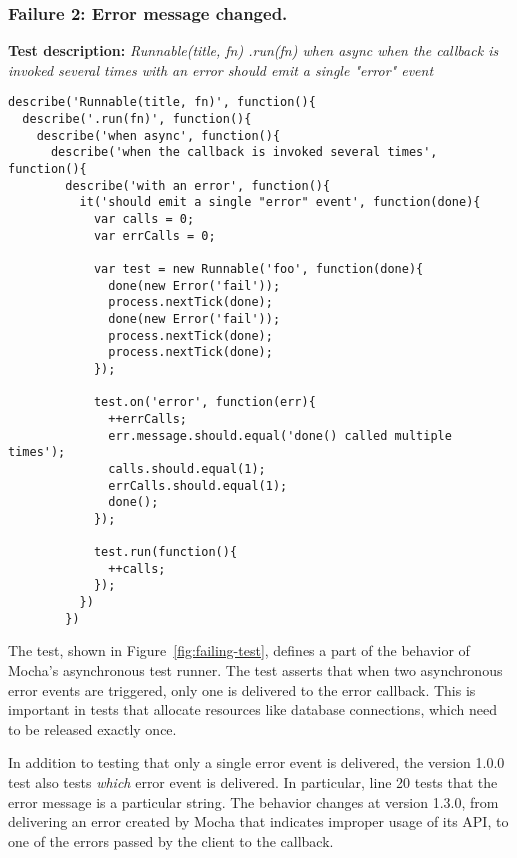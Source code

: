 \subsubsection{Failure 2: Error message changed.}
\label{sec:failure2}
{\bf Test description: }
%
{\em Runnable(title, fn) .run(fn) when async when the callback is
  invoked several times with an error should emit a single "error"
  event }

\begin{figure*}
\begin{lstlisting}
describe('Runnable(title, fn)', function(){
  describe('.run(fn)', function(){
    describe('when async', function(){
      describe('when the callback is invoked several times', function(){
        describe('with an error', function(){
          it('should emit a single "error" event', function(done){
            var calls = 0;
            var errCalls = 0;

            var test = new Runnable('foo', function(done){
              done(new Error('fail'));
              process.nextTick(done);
              done(new Error('fail'));
              process.nextTick(done);
              process.nextTick(done);
            });

            test.on('error', function(err){
              ++errCalls;
              err.message.should.equal('done() called multiple times');
              calls.should.equal(1);
              errCalls.should.equal(1);
              done();
            });

            test.run(function(){
              ++calls;
            });
          })
        })
\end{lstlisting}
\caption{A failing mocha {\tt jsapi} test}
\label{fig:failing-test}
\end{figure*}

The test, shown in Figure~\ref{fig:failing-test}, defines a
part of the behavior of Mocha's asynchronous test runner. The test 
asserts that when two asynchronous error events are triggered, only one
is delivered to the error callback. This is important in tests that
allocate resources like database connections, which need to be released
exactly once.

In addition to testing that only a single error event is delivered,
the version 1.0.0 test also tests {\em which} error event is
delivered. In particular, line 20 tests that the error message is a
particular string. The behavior changes at version 1.3.0, from
delivering an error created by Mocha that indicates improper usage of
its API, to one of the errors passed by the client to the callback.


